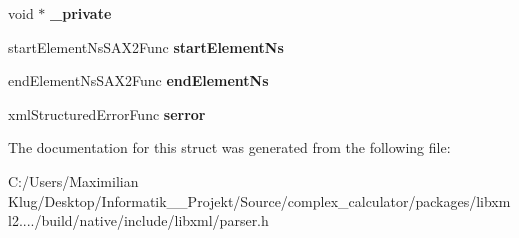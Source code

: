 \begin{DoxyCompactItemize}
void $\ast$ {\bfseries \+\_\+private}
\item 
\mbox{\label{struct__xml_s_a_x_handler_a62aaeb317e06a20f32b90f105003e45a}} 
start\+Element\+Ns\+S\+A\+X2\+Func {\bfseries start\+Element\+Ns}
\item 
\mbox{\label{struct__xml_s_a_x_handler_ac5d1d80f714269f30425206428c2675e}} 
end\+Element\+Ns\+S\+A\+X2\+Func {\bfseries end\+Element\+Ns}
\item 
\mbox{\label{struct__xml_s_a_x_handler_ae022c0ff2961999df734b58fc0832338}} 
xml\+Structured\+Error\+Func {\bfseries serror}
\end{DoxyCompactItemize}


The documentation for this struct was generated from the following file\+:\begin{DoxyCompactItemize}
\item 
C\+:/\+Users/\+Maximilian Klug/\+Desktop/\+Informatik\+\_\+\_\+\+Projekt/\+Source/complex\+\_\+calculator/packages/libxml2..../build/native/include/libxml/parser.\+h\end{DoxyCompactItemize}
